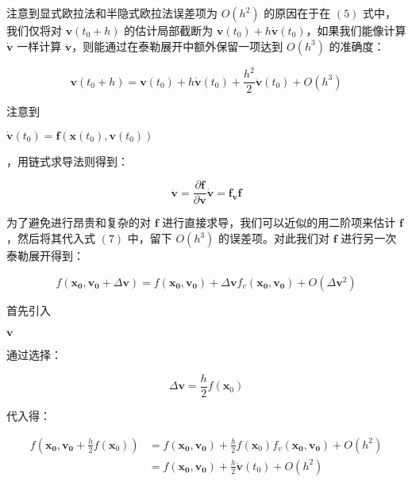 \documentclass[UTF8]{ctexart}
\begin{document}
注意到显式欧拉法和半隐式欧拉法误差项为 $O(h^2)$ 的原因在于在 $(5)$ 式中，我们仅将对 $\mathbf{v}(t_0+h)$ 的估计局部截断为 $\mathbf{v}(t_0) + h \dot{\mathbf{v}}(t_0)$，如果我们能像计算 $\dot{\mathbf{v}}$ 一样计算 $\ddot{\mathbf{v}}$，则能通过在泰勒展开中额外保留一项达到 $O(h^3)$ 的准确度：

\begin{large}
\begin{equation}
\mathbf{v}(t_0+h) = \mathbf{v}(t_0) + h \dot{\mathbf{v}}(t_0) + \frac{h^2}{2} \ddot{\mathbf{v}}(t_0) + O(h^3)
\end{equation}
\end{large}

注意到 \begin{large}$\dot{\mathbf{v}}(t_0)=\mathbf{f}(\mathbf{x}(t_0), \mathbf{v}(t_0))$\end{large}，用链式求导法则得到：

\begin{large}
\begin{equation}
\ddot{\mathbf{v}} = \frac{\partial \mathbf{f}}{\partial \mathbf{v}} \dot{\mathbf{v}} = \mathbf{f_v} \mathbf{f}
\end{equation}
\end{large}

为了避免进行昂贵和复杂的对 $\mathbf{f}$ 进行直接求导，我们可以近似的用二阶项来估计 $\mathbf{f}$，然后将其代入式 $(7)$ 中，留下 $O(h^3)$ 的误差项。对此我们对 $\mathbf{f}$ 进行另一次泰勒展开得到：

\begin{large}
\begin{equation}
f(\mathbf{x_0}, \mathbf{v_0} + \Delta \mathbf{v}) = f(\mathbf{x_0}, \mathbf{v_0}) + \Delta \mathbf{v} f_v(\mathbf{x_0}, \mathbf{v_0}) + O(\Delta \mathbf{v}^2)
\end{equation}
\end{large}

首先引入 \begin{large} $\ddot{\mathbf{v}}$ \end{large} 通过选择：

\begin{large}
\begin{equation}
\Delta \mathbf{v} = \frac{h}{2} f(\mathbf{x}_0)
\end{equation}
\end{large}

代入得：

\begin{large}
\begin{equation}
\begin{split}
f(\mathbf{x_0}, \mathbf{v_0} + \frac{h}{2} f(\mathbf{x}_0)) &= f(\mathbf{x_0}, \mathbf{v_0}) + \frac{h}{2} f(\mathbf{x}_0) f_v(\mathbf{x_0}, \mathbf{v_0}) + O(h^2) \\ &= f(\mathbf{x_0}, \mathbf{v_0}) + \frac{h}{2} \ddot{\mathbf{v}}(t_0) + O(h^2)
\end{split}
\end{equation}
\end{large}
\end{document}
